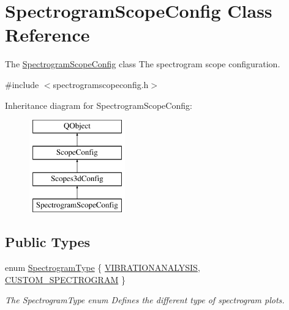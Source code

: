 \hypertarget{class_spectrogram_scope_config}{\section{Spectrogram\-Scope\-Config Class Reference}
\label{class_spectrogram_scope_config}
}


The \hyperlink{class_spectrogram_scope_config}{Spectrogram\-Scope\-Config} class The spectrogram scope configuration.  




{\ttfamily \#include $<$spectrogramscopeconfig.\-h$>$}

Inheritance diagram for Spectrogram\-Scope\-Config\-:\begin{figure}[H]
\begin{center}
\leavevmode
\includegraphics[height=4.000000cm]{class_spectrogram_scope_config}
\end{center}
\end{figure}
\subsection*{Public Types}
\begin{DoxyCompactItemize}
\item 
enum \hyperlink{group___scope_plugin_ga4c227eca53956a4dda5ee8877b7868c6}{Spectrogram\-Type} \{ \hyperlink{group___scope_plugin_gga4c227eca53956a4dda5ee8877b7868c6a1412daaa24267bf3b82a82d8b8427238}{V\-I\-B\-R\-A\-T\-I\-O\-N\-A\-N\-A\-L\-Y\-S\-I\-S}, 
\hyperlink{group___scope_plugin_gga4c227eca53956a4dda5ee8877b7868c6a7f0d2eab37446fb5b0e0136911fa069f}{C\-U\-S\-T\-O\-M\-\_\-\-S\-P\-E\-C\-T\-R\-O\-G\-R\-A\-M}
 \}
\begin{DoxyCompactList}\small\item\em The Spectrogram\-Type enum Defines the different type of spectrogram plots. \end{DoxyCompactList}\end{DoxyCompactItemize}

